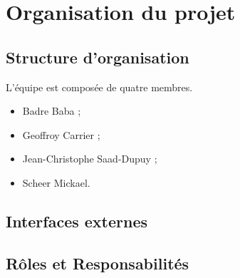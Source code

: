 
\section{Organisation du projet}
\subsection{Structure d’organisation}
L'équipe est composée de quatre membres.
\begin{itemize}
	\item Badre Baba ;
	\item Geoffroy Carrier ;
	\item Jean-Christophe Saad-Dupuy ;
	\item Scheer Mickael.
\end{itemize}

\subsection{Interfaces externes}
\subsection{Rôles et Responsabilités}
